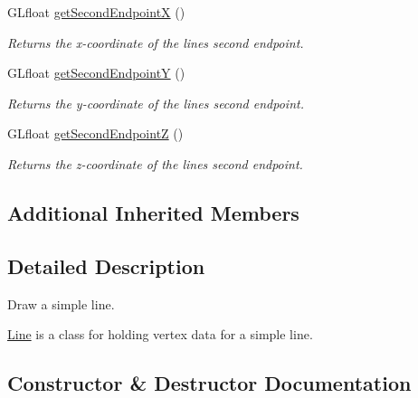 \begin{DoxyCompactItemize}
G\+Lfloat \hyperlink{classtsgl_1_1_line_a1c187707ad666a370bdaecfbbec1cace}{get\+Second\+EndpointX} ()
\begin{DoxyCompactList}\small\item\em Returns the x-\/coordinate of the line\textquotesingle{}s second endpoint. \end{DoxyCompactList}\item 
G\+Lfloat \hyperlink{classtsgl_1_1_line_acc0a127826c5d6a5bd763d8116c97578}{get\+Second\+EndpointY} ()
\begin{DoxyCompactList}\small\item\em Returns the y-\/coordinate of the line\textquotesingle{}s second endpoint. \end{DoxyCompactList}\item 
G\+Lfloat \hyperlink{classtsgl_1_1_line_a498daae6c481ed0c4d8e86fc9da11053}{get\+Second\+EndpointZ} ()
\begin{DoxyCompactList}\small\item\em Returns the z-\/coordinate of the line\textquotesingle{}s second endpoint. \end{DoxyCompactList}\end{DoxyCompactItemize}
\subsection*{Additional Inherited Members}


\subsection{Detailed Description}
Draw a simple line. 

\hyperlink{classtsgl_1_1_line}{Line} is a class for holding vertex data for a simple line. 

\subsection{Constructor \& Destructor Documentation}
\mbox{\label{classtsgl_1_1_line_af139d320a5f9dfb1954e85a35c37ba0a}} 

